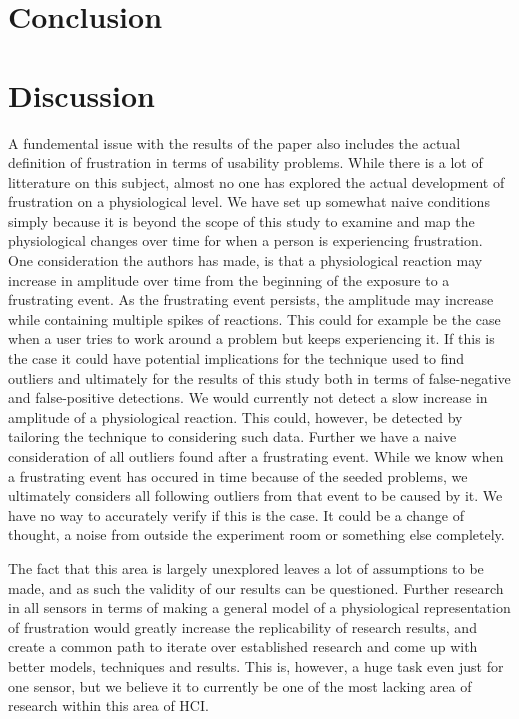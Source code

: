 
\section{Conclusion}


\section{Discussion}
A fundemental issue with the results of the paper also includes the actual definition of frustration in terms of usability problems. 
While there is a lot of litterature on this subject, almost no one has explored the actual development of frustration on a physiological level. 
We have set up somewhat naive conditions simply because it is beyond the scope of this study to examine and map the physiological changes over time for when a person is experiencing frustration. 
One consideration the authors has made, is that a physiological reaction may increase in amplitude over time from the beginning of the exposure to a frustrating event. As the frustrating event persists, the amplitude may increase while containing multiple spikes of reactions. This could for example be the case when a user tries to work around a problem but keeps experiencing it.
If this is the case it could have potential implications for the technique used to find outliers and ultimately for the results of this study both in terms of false-negative and false-positive detections.
We would currently not detect a slow increase in amplitude of a physiological reaction. This could, however, be detected by tailoring the technique to considering such data. 
Further we have a naive consideration of all outliers found after a frustrating event. 
While we know when a frustrating event has occured in time because of the seeded problems, we ultimately considers all following outliers from that event to be caused by it. 
We have no way to accurately verify if this is the case.
It could be a change of thought, a noise from outside the experiment room or something else completely.

The fact that this area is largely unexplored leaves a lot of assumptions to be made, and as such the validity of our results can be questioned. 
Further research in all sensors in terms of making a general model of a physiological representation of frustration would greatly increase the replicability of research results, and create a common path to iterate over established research and come up with better models, techniques and results. 
This is, however, a huge task even just for one sensor, but we believe it to currently be one of the most lacking area of research within this area of HCI.


